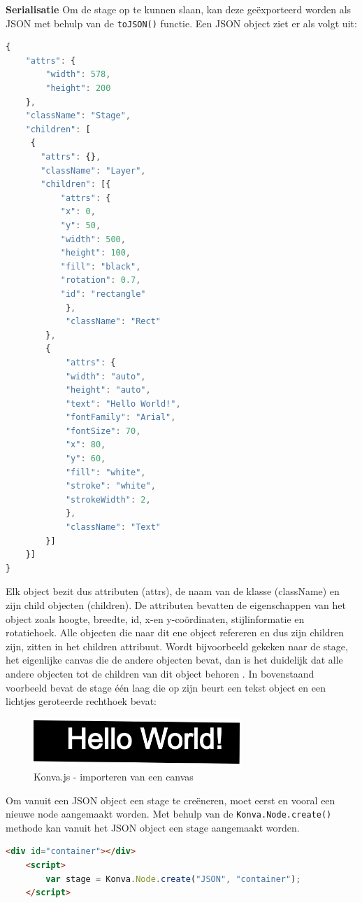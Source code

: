 \textbf{Serialisatie} \break
Om de stage op te kunnen slaan, kan deze ge\"{e}xporteerd worden als JSON met behulp van de \texttt{toJSON()} functie. Een JSON object ziet er als volgt uit:

\begin{lstlisting}[language=javascript]
{
	"attrs": {
	 	"width": 578,
	 	"height": 200
	},
	"className": "Stage",
	"children": [
	 {
	   "attrs": {},
	   "className": "Layer",
	   "children": [{
		   "attrs": {
		   "x": 0,
		   "y": 50,
		   "width": 500,
		   "height": 100,
		   "fill": "black",
		   "rotation": 0.7,
		   "id": "rectangle"
	   		},
	  		"className": "Rect"
   		},
   		{
			"attrs": {
			"width": "auto",
			"height": "auto",
			"text": "Hello World!",
			"fontFamily": "Arial",
			"fontSize": 70,
			"x": 80,
			"y": 60,
			"fill": "white",
			"stroke": "white",
			"strokeWidth": 2,
	   		},
   			"className": "Text"
		}]
 	}]
}
\end{lstlisting}

Elk object bezit dus attributen (attrs), de naam van de klasse (className) en zijn child objecten (children).  De attributen bevatten de eigenschappen van het object zoals hoogte, breedte, id, x-en y-co\"{o}rdinaten, stijlinformatie en rotatiehoek. Alle objecten die naar dit ene object refereren en dus zijn children zijn, zitten in het children attribuut. Wordt bijvoorbeeld gekeken naar de stage, het eigenlijke canvas die de andere objecten bevat, dan is het duidelijk dat alle andere objecten tot de children van dit object behoren \cite{KonvaSerialize}. In bovenstaand voorbeeld bevat de stage \'{e}\'{e}n laag die op zijn beurt een tekst object en een lichtjes geroteerde rechthoek bevat: %

\begin{figure}[H]
	\centering
	\includegraphics[width=0.7\textwidth]{Figuren/KonvaJSLoadFromJSON.png}
	\caption{Konva.js - importeren van een canvas} 
	\label{fig:KonvaJSLoadFromJSON}
\end{figure} 

Om vanuit een JSON object een stage te cre\"{e}neren, moet eerst en vooral een nieuwe node aangemaakt worden. Met behulp van de \texttt{Konva.Node.create()} methode kan vanuit het JSON object een stage aangemaakt worden. 
\begin{lstlisting}[language=HTML]
	<div id="container"></div>
	<script>
		var stage = Konva.Node.create("JSON", "container");
	</script>
\end{lstlisting}

